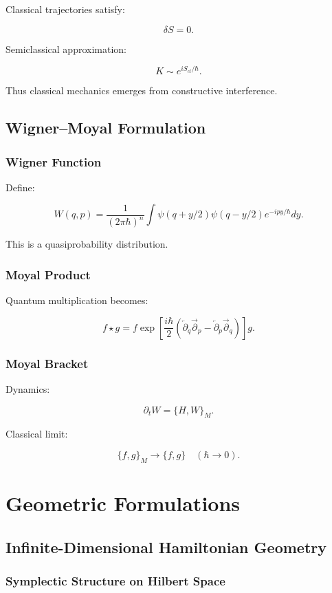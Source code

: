 \documentclass[11pt]{book}
\begin{document}
Classical trajectories satisfy:

\[
\delta S=0.
\]

Semiclassical approximation:

\[
K \sim e^{iS_{cl}/\hbar}.
\]

Thus classical mechanics emerges from constructive interference.

\chapter{Wigner--Moyal Formulation}

\section{Wigner Function}

Define:

\[
W(q,p)
=
\frac{1}{(2\pi\hbar)^n}
\int\psi(q+ y/2)\psi(q-y/2)e^{-ipy/\hbar}dy.
\]

This is a quasiprobability distribution.

\section{Moyal Product}

Quantum multiplication becomes:

\[
f\star g
=
f
\exp
\left[
\frac{i\hbar}{2}
\left(
\overleftarrow\partial_q\overrightarrow\partial_p
-
\overleftarrow\partial_p\overrightarrow\partial_q
\right)
\right]
g.
\]

\section{Moyal Bracket}

Dynamics:

\[
\partial_t W
=
\{H,W\}_M.
\]

Classical limit:

\[
\{f,g\}_M
\to
\{f,g\}
\quad
(\hbar\to0).
\]

\part{Geometric Formulations}

\chapter{Infinite-Dimensional Hamiltonian Geometry}

\section{Symplectic Structure on Hilbert Space}
\end{document}
